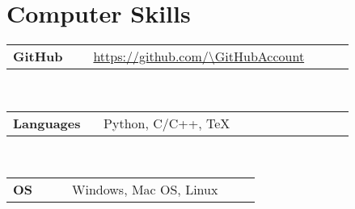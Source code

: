 \newcommand{\skill}[2]
  {\small \color{maincolor}
    \begin{tabular}{@{} p{0.2\linewidth} p{0.64\linewidth}}
      \textbf{\color{hlcolor-0} #1} & \textcolor{maincolor}{#2}
    \end{tabular}
  }
  
\newcommand{\github}
  {\small \url{https://github.com/\GitHubAccount}}


\section*{Computer Skills}
\begin{cvcontent}
  \skill{GitHub}{\github}\\ [0.5mm]
  \skill{Languages}{Python, C/C++, TeX}\\ [0.5mm]
  \skill{OS}{Windows, Mac OS, Linux}
\end{cvcontent}
